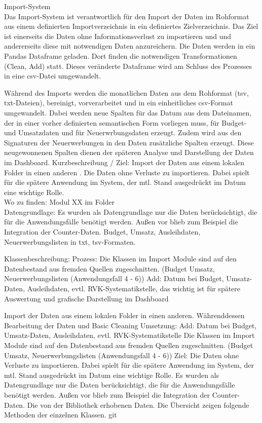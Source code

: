     
    Import-System\\
    Das Import-System ist verantwortlich für den Import der Daten im Rohformat aus einem definierten Importverzeichnis in ein definiertes Zielverzeichnis. Das Ziel
    ist einerseits die Daten ohne Informationsverlust zu importieren und und andererseits diese mit notwendigen Daten anzureichern. Die Daten werden in ein Pandas Dataframe
    geladen. Dort finden die notwendigen Transformationen (Clean, Add) statt. Dieses veränderte Dataframe wird am Schluss des Prozesses in eine csv-Datei umgewandelt.
    
    
    Während des Imports werden 
    die monatlichen Daten aus dem Rohformat (tsv, txt-Dateien), bereinigt, vorverarbeitet und in ein einheitliches csv-Format umgewandelt. Dabei werden neue Spalten für das
    Datum aus dem Dateinamen, der in einer vorher definierten semantischen Form vorliegen muss, für Budget- und Umsatzdaten und für Neuerwrbungsdaten erzeugt. Zudem wird aus
    den Signaturen der Neuerwerbungen in den Daten zusätzliche Spalten erzeugt. Diese neugewonnenen Spalten dienen der späteren Analyse und Darstellung der Daten im Dashboard.
    Kurzbeschreibung / Ziel: Import der Daten aus einem lokalen Folder in einen anderen . 
    Die Daten ohne Verluste zu importieren. Dabei spielt für die spätere Anwendung im System, der mtl. Stand ausgedrückt im Datum eine wichtige Rolle.\\
    Wo zu finden: Modul XX im Folder \\
    Datengrundlage: Es wurden als Datengrundlage nur die Daten berücksichtigt, die für die Anwendungsfälle benötigt werden.
    Außen vor blieb zum Beispiel die Integration der Counter-Daten.
    Budget, Umsatz, Ausleihdaten, Neuerwerbungslisten in txt, tsv-Formaten.
 
 
 
 
 
 
 
 
 
 
    Klassenbeschreibung:
    Prozess: Die Klassen im Import Module sind auf den Datenbestand aus fremden Quellen zugeschnitten.
    (Budget Umsatz, Neuerwerbungslisten (Anwendungsfall 4 - 6))
    Add: Datum bei Budget, Umsatz-Daten, Ausleihdaten, evtl. RVK-Systematikstelle, das wichtig ist für spätere Auswertung und grafische Darstellung
    im Dashboard
  
  
    Import der Daten aus einem lokalen Folder in einen anderen. 
    Währenddessen Bearbeitung der Daten und Basic Cleaning
    Umsetzung:
    Add: Datum bei Budget, Umsatz-Daten, Ausleihdaten, evtl. RVK-Systematikstelle 
    Die Klassen im Import Module sind auf den Datenbestand aus fremden Quellen zugeschnitten.
    (Budget Umsatz, Neuerwerbungslisten (Anwendungsfall 4 - 6))
    Ziel: Die Daten ohne Verluste zu importieren. Dabei spielt für die spätere Anwendung im System, der mtl. Stand
    ausgedrückt im Datum eine wichtige Rolle.
    Es wurden als Datengrundlage nur die Daten berücksichtigt, die für die Anwendungsfälle benötigt werden.
    Außen vor blieb zum Beispiel die Integration der Counter-Daten.
    Die von der Bibliothek erhobenen Daten. Die Übersicht zeigen folgende Methoden der einzelnen Klassen.
    git
    

